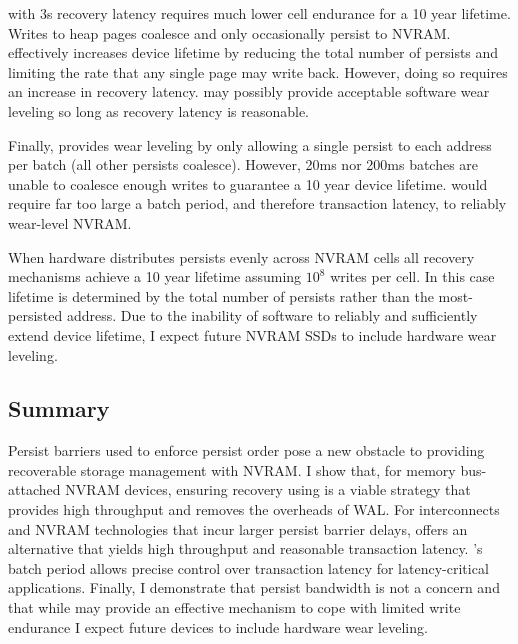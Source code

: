 \NVDisk with 3s recovery latency requires much lower cell endurance for a 10 year lifetime.
Writes to heap pages coalesce and only occasionally persist to NVRAM.
\NVDisk effectively increases device lifetime by reducing the total number of persists and limiting the rate that any single page may write back.
However, doing so requires an increase in recovery latency.
\NVDisk may possibly provide acceptable software wear leveling so long as recovery latency is reasonable.

Finally, \GroupCommit provides wear leveling by only allowing a single persist to each address per batch (all other persists coalesce).
However, 20ms nor 200ms batches are unable to coalesce enough writes to guarantee a 10 year device lifetime.
\GroupCommit would require far too large a batch period, and therefore transaction latency, to reliably wear-level NVRAM.

When hardware distributes persists evenly across NVRAM cells all recovery mechanisms achieve a 10 year lifetime assuming $10^8$ writes per cell.
In this case lifetime is determined by the total number of persists rather than the most-persisted address.
Due to the inability of software to reliably and sufficiently extend device lifetime, I expect future NVRAM SSDs to include hardware wear leveling.

\subsection{Summary}
\label{sec:OLTP_eval:Persists:Summary}
Persist barriers used to enforce persist order pose a new obstacle to providing recoverable storage management with NVRAM.
I show that, for memory bus-attached NVRAM devices, ensuring recovery using \InPlace is a viable strategy that provides high throughput and removes the overheads of WAL.
For interconnects and NVRAM technologies that incur larger persist barrier delays, \GroupCommit offers an alternative that yields high throughput and reasonable transaction latency.
\GroupCommit's batch period allows precise control over transaction latency for latency-critical applications.
Finally, I demonstrate that persist bandwidth is not a concern and that while \NVDisk may provide an effective mechanism to cope with limited write endurance I expect future devices to include hardware wear leveling.

